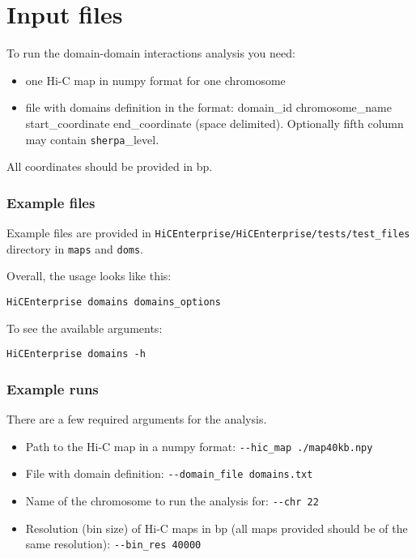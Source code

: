 \section{Input files}
\label{sec:input2}

To run the domain-domain interactions analysis you need:
\begin{itemize}
    \item one Hi-C map in numpy format for one chromosome
    \item file with domains definition in the format: domain\_id chromosome\_name start\_coordinate end\_coordinate (space
    delimited). Optionally fifth column may contain \lstinline{sherpa}\_level.
\end{itemize}

All coordinates should be provided in bp.

\subsubsection{Example files}
Example files are provided in \lstinline{HiCEnterprise/HiCEnterprise/tests/test_files} directory in \lstinline{maps} and \lstinline{doms}. 

Overall, the usage looks like this:

\begin{lstlisting}
HiCEnterprise domains domains_options
\end{lstlisting}


To see the available arguments:
\begin{lstlisting}
HiCEnterprise domains -h
\end{lstlisting}


\subsubsection{Example runs}
There are a few required arguments for the analysis.
\begin{itemize}
    \item Path to the Hi-C map in a numpy format: \lstinline{--hic_map ./map40kb.npy}
    \item File with domain definition: \lstinline{--domain_file domains.txt}
    \item Name of the chromosome to run the analysis for: \lstinline{--chr 22}
    \item Resolution (bin size) of Hi-C maps in bp (all maps provided should be of the same resolution): \lstinline{--bin_res 40000}
\end{itemize}

